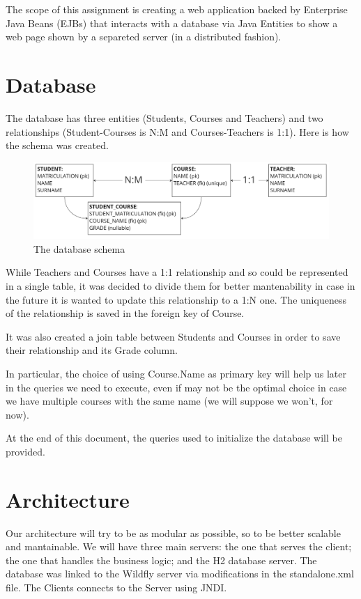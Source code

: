 \documentclass[12pt, a4paper]{article}
\begin{document}
  The scope of this assignment is creating a web application backed by Enterprise Java Beans (EJBs) that interacts with a database via Java Entities to show a web page shown by a separeted server (in a distributed fashion).

  \section{Database}

  The database has three entities (Students, Courses and Teachers) and two relationships (Student-Courses is N:M and Courses-Teachers is 1:1). Here is how the schema was created.

  \begin{figure}[H]
    \centering
    \includegraphics[width=\columnwidth]{db_schema.png}
    \caption{The database schema}
  \end{figure}

  While Teachers and Courses have a 1:1 relationship and so could be represented in a single table, it was decided to divide them for better mantenability in case in the future it is wanted to update this relationship to a 1:N one. The uniqueness of the relationship is saved in the foreign key of Course.

  It was also created a join table between Students and Courses in order to save their relationship and its Grade column.

  In particular, the choice of using Course.Name as primary key will help us later in the queries we need to execute, even if may not be the optimal choice in case we have multiple courses with the same name (we will suppose we won't, for now).

  At the end of this document, the queries used to initialize the database will be provided.

  \section{Architecture}

  Our architecture will try to be as modular as possible, so to be better scalable and mantainable. We will have three main servers: the one that serves the client; the one that handles the business logic; and the H2 database server. The database was linked to the Wildfly server via modifications in the standalone.xml file. The Clients connects to the Server using JNDI.
\end{document}
